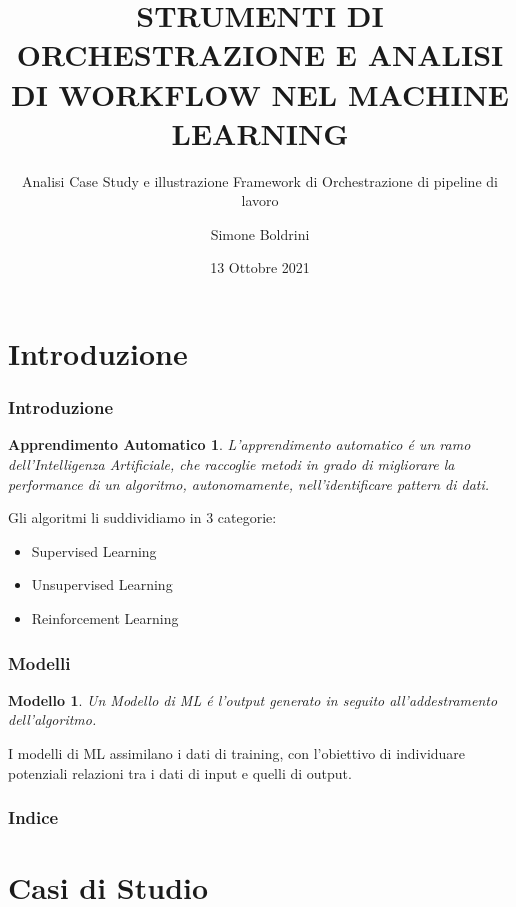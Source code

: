 \documentclass[xcolor=dvipsnames]{beamer}
\title[Machine Learning]{STRUMENTI DI ORCHESTRAZIONE E ANALISI DI WORKFLOW NEL MACHINE LEARNING}
\subtitle[]{Analisi Case Study e illustrazione Framework di Orchestrazione di pipeline di lavoro}
\author{Simone Boldrini}
\date{13 Ottobre 2021}
\institute[]{Alma Mater Studiorum - Universitá di Bologna \\ Facoltá di Scienze}
\begin{document}
\begin{frame}
    \titlepage
\end{frame}


\section*{Introduzione}
\begin{frame}
    \frametitle{Introduzione}
    
    \newtheorem{Apprendimento Automatico}{Apprendimento Automatico}

    \begin{Apprendimento Automatico}
        L'\alert{apprendimento automatico} é un ramo dell'Intelligenza Artificiale, che raccoglie metodi in grado di migliorare la performance di un algoritmo, autonomamente, nell'identificare pattern di dati.
    \end{Apprendimento Automatico}
    Gli algoritmi li suddividiamo in 3 categorie:
    \begin{itemize}
        \item Supervised Learning
        \item Unsupervised Learning
        \item Reinforcement Learning
    \end{itemize}
\end{frame}
\begin{frame}
 \frametitle{Modelli} 
 \newtheorem{Modello}{Modello}
 \begin{Modello}
Un Modello di ML é l'output generato in seguito all'addestramento dell'algoritmo.
 \end{Modello}  
 I modelli di ML assimilano i dati di training, con l'obiettivo di individuare potenziali relazioni tra i dati di input e quelli di output.
\end{frame}



    \begin{frame}
    \frametitle{Indice}
    \tableofcontents[]
    \end{frame}
    \section{Casi di Studio}
\end{document}
